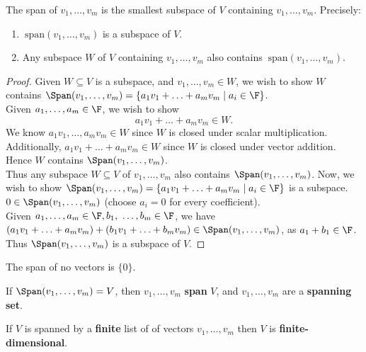 \documentclass[math0540-lecture-notes.tex]{subfiles}
\begin{document}
\begin{proposition}{}
  The span of $v_1,\ldots,v_m$ is the smallest subspace of $V$ containing $ v_1,\ldots,v_m$.
  Precisely:
  \begin{enumerate}
    \item $~\text{span}(v_1,\ldots,v_m)$ is a subspace of $V$.
    \item Any subspace  $W$ of $V$ containing $v_1,\ldots,v_m$ also contains
      $~\text{span}(v_1,\ldots,v_m)$.
  \end{enumerate}
\end{proposition}

\begin{proof}[Proof]
  Given $W\subseteq V$ is a subspace, and $ v_1,\ldots,v_m\in W$, we wish to show $W$ contains
  $\Span(v_1,\ldots,v_m)=\{a_1v_1+\ldots+a_mv_m\mid a_i\in \F \} $. \\
  Given $ a_1,\ldots,a_m\in \F$, we wish to show \[
    a_1v_1+\ldots+a_mv_m\in W
  .\] We know $ a_1v_1,\ldots,a_mv_m\in W$ since $W$ is closed under scalar multiplication.
  Additionally, $ a_1v_1+\ldots+a_mv_m\in W$ since $W$ is closed under vector addition. Hence $W$ 
  contains $\Span(v_1,\ldots,v_m)$.\\
  Thus any subspace $W\subseteq V$ of $ v_1,\ldots,v_m$ also contains $\Span(v_1,\ldots,v_m)$.
  Now, we wish to show  $\Span(v_1,\ldots,v_m)=\{a_1v_1+\ldots+a_mv_m\mid a_i\in \F\} $ is a
  subspace.\\
  $0\in \Span(v_1,\ldots,v_m)$ (choose $a_i=0$ for every coefficient).\\
  Given $ a_1,\ldots,a_m\in \F,b_1,\ \ldots,b_m\in \F$, we have $ (a_1v_1+\ldots+a_mv_m) + (b_1v_1+\ldots+b_mv_m)\in \Span(v_1,\ldots,v_m)$, as $ a_1+b_1\in
  \F$.\\
  Thus $\Span(v_1,\ldots,v_m)$ is a subspace of $V$.
\end{proof}

\begin{definition}{}
  The span of no vectors is $\{ 0 \}$.
\end{definition}

\begin{definition}{}
  If $\Span(v_1,\ldots,v_m)=V$, then $ v_1,\ldots,v_m$ \textbf{span} $V$, and  $v_1,\ldots,v_m$ are
  a \textbf{spanning set}.
\end{definition}

\begin{definition}{}
  If $V$ is spanned by a \textbf{finite} list of of vectors $v_1,\ldots,v_m$ then $V$ is
  \textbf{finite-dimensional}.
\end{definition}
\end{document}
